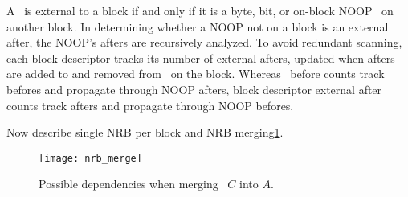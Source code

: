 A \chdesc\ is external to a block if and only if it is a byte, bit, or
on-block NOOP \chdesc\ on another block. In determining whether a NOOP
not on a block is an external after, the NOOP's afters are recursively
analyzed. To avoid redundant scanning, each block descriptor tracks
its number of external afters, updated when afters are added to and
removed from \chdescs\ on the block. Whereas \chdesc\ before counts
track befores and propagate through NOOP afters, block descriptor
external after counts track afters and propagate through NOOP befores.

Now describe single NRB per block and NRB merging\ref{fig:nrb-merge}.

\begin{figure}[htb]
  \centering
  \texttt{[image: nrb\_merge]}
  \caption{Possible dependencies when merging \chdesc\ $C$ into $A$.}
  \label{fig:nrb-merge}
\end{figure}



